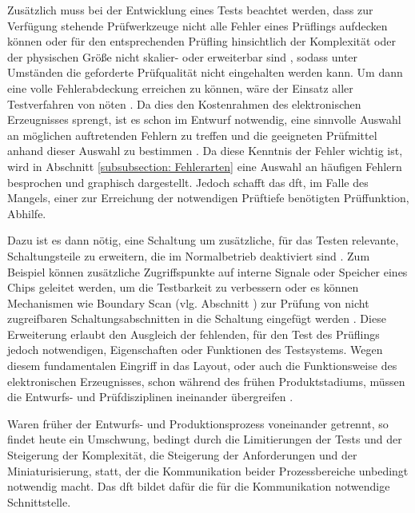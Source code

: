         Zusätzlich muss bei der Entwicklung eines Tests beachtet werden, dass zur Verfügung stehende Prüfwerkzeuge nicht alle Fehler eines Prüflings aufdecken können oder für den entsprechenden Prüfling hinsichtlich der Komplexität oder der physischen Größe nicht skalier- oder erweiterbar sind \cite{eggersglus_test_2014}, sodass unter Umständen die geforderte Prüfqualität nicht eingehalten werden kann.
        Um dann eine volle Fehlerabdeckung erreichen zu können, wäre der Einsatz aller Testverfahren von nöten \cite{berger_test-_2012}.
        Da dies den Kostenrahmen des elektronischen Erzeugnisses sprengt, ist es schon im Entwurf notwendig, eine sinnvolle Auswahl an möglichen auftretenden Fehlern zu treffen und die geeigneten Prüfmittel anhand dieser Auswahl zu bestimmen \cite{karger_pruftechnik_1985}.
        Da diese Kenntnis der Fehler wichtig ist, wird in Abschnitt \ref{subsubsection: Fehlerarten} eine Auswahl an häufigen Fehlern besprochen und graphisch dargestellt. 
        Jedoch schafft das \ac{dft}, im Falle des Mangels, einer zur Erreichung der notwendigen Prüftiefe benötigten Prüffunktion, Abhilfe.

        Dazu ist es dann nötig, eine Schaltung um zusätzliche, für das Testen relevante, Schaltungsteile zu erweitern, die im Normalbetrieb deaktiviert sind \cite{eggersglus_test_2014}.
        Zum Beispiel können zusätzliche Zugriffspunkte auf interne Signale oder Speicher eines Chips geleitet werden, um die Testbarkeit zu verbessern oder es können Mechanismen wie Boundary Scan (vlg. Abschnitt ) zur Prüfung von nicht zugreifbaren Schaltungsabschnitten in die Schaltung eingefügt werden \cite{eggersglus_test_2014}.
        Diese Erweiterung erlaubt den Ausgleich der fehlenden, für den Test des Prüflings jedoch notwendigen, Eigenschaften oder Funktionen des Testsystems. 
        Wegen diesem fundamentalen Eingriff in das Layout, oder auch die Funktionsweise des elektronischen Erzeugnisses, schon während des frühen Produktstadiums, müssen die Entwurfs- und Prüfdisziplinen ineinander übergreifen \cite{grout_integrated_2006}.

        Waren früher der Entwurfs- und Produktionsprozess voneinander getrennt, so findet heute ein Umschwung, bedingt durch die Limitierungen der Tests und der Steigerung der Komplexität, die Steigerung der Anforderungen und der Miniaturisierung, statt, der die Kommunikation beider Prozessbereiche unbedingt notwendig macht.
        Das \acl{dft} bildet dafür die für die Kommunikation notwendige Schnittstelle. \cite{grout_integrated_2006}

